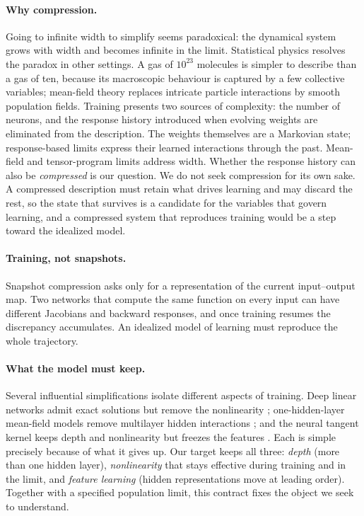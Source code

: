 \documentclass[11pt]{article}
\theoremstyle{definition}
\theoremstyle{remark}
\begin{document}
\paragraph{Why compression.}
Going to infinite width to simplify seems paradoxical: the dynamical system grows
with width and becomes infinite in the limit.  Statistical physics resolves the
paradox in other settings.  A gas of $10^{23}$ molecules is simpler to describe
than a gas of ten, because its macroscopic behaviour is captured by a few
collective variables; mean-field theory replaces intricate particle interactions
by smooth population fields.  Training presents two sources of complexity:
the number of neurons, and the response history introduced when evolving
weights are eliminated from the description.  The weights themselves are a
Markovian state; response-based limits express their learned interactions
through the past.  Mean-field and tensor-program limits address width.
Whether the response history can also be \emph{compressed} is our question.
We do not seek compression for its own sake.  A compressed
description must retain what drives learning and may discard the rest, so the
state that survives is a candidate for the variables that govern learning, and
a compressed system that reproduces training would be a step toward the
idealized model.

\paragraph{Training, not snapshots.}
Snapshot compression asks only for a representation of the current input--output
map.  Two networks that compute the same function on every input can
have different Jacobians and backward responses, and once training resumes the
discrepancy accumulates.  An idealized model of learning must reproduce the whole
trajectory.

\paragraph{What the model must keep.}
Several influential simplifications isolate different aspects of training.
Deep linear networks admit exact solutions but remove the
nonlinearity \citep{saxe2014exact}; one-hidden-layer mean-field models remove
multilayer hidden interactions \citep{chizat2018global,mei2018meanfield,sirignano2019lln}; and
the neural tangent kernel keeps depth and nonlinearity but freezes the features
\citep{jacot2018ntk,lee2019wide,chizat2019lazy}.  Each is simple precisely
because of what it gives up.  Our target keeps all three: \emph{depth} (more than one
hidden layer), \emph{nonlinearity} that stays effective during training and in
the limit, and \emph{feature learning} (hidden representations move at leading
order).  Together with a specified population limit, this contract fixes the
object we seek to understand.
\end{document}
